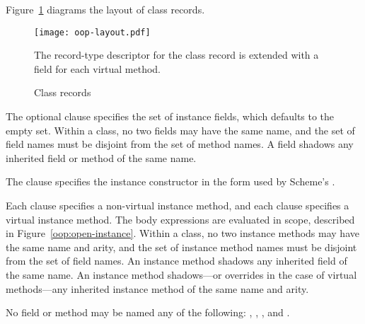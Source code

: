 Figure~\ref{oop:records} diagrams the layout of class records.

\begin{figure}[p]
  \begin{center}
    \texttt{[image: oop-layout.pdf]}
  \end{center}
  The record-type descriptor for the class record is extended with a field for each
  virtual method.
  \caption{\label{oop:records}Class records}
\end{figure}

The optional  clause specifies the set of instance fields, which defaults to
the empty set. Within a class, no two fields may have the same name, and the set of field
names must be disjoint from the set of method names. A field shadows any inherited field
or method of the same name.

The  clause specifies the instance constructor in the form used by Scheme's
.

Each  clause specifies a non-virtual instance method, and each 
clause specifies a virtual instance method. The body expressions are evaluated in
 scope, described in Figure~\ref{oop:open-instance}. Within a class, no
two instance methods may have the same name and arity, and the set of instance method
names must be disjoint from the set of field names. An instance method shadows any
inherited field of the same name. An instance method shadows---or overrides in the case of
virtual methods---any inherited instance method of the same name and arity.

No field or method may be named any of the following: , ,
, and .

